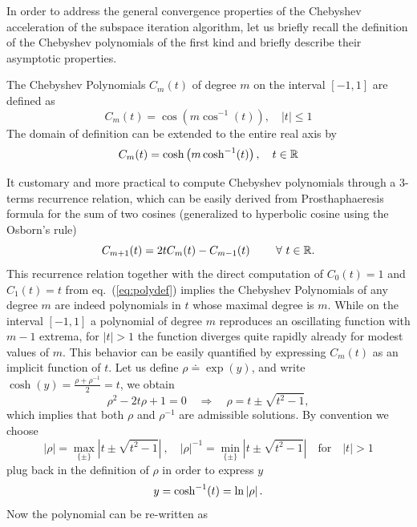 In order to address the general convergence properties of the
Chebyshev acceleration of the subspace iteration algorithm, let us
briefly recall the definition of the Chebyshev polynomials of the
first kind and briefly describe their asymptotic properties.
\begin{definition}
  The Chebyshev Polynomials $C_m(t)$ of degree $m$ on the interval
  $\left[-1,1\right]$ are defined as
	\begin{equation}
	C_m(t)=\cos\left(m\cos^{-1}(t)\right), \quad \left| t\right| \leq 1
	\label{eq:polydef}
	\end{equation} 
The domain of definition can be extended to the entire real axis by
	\begin{equation*}
	C_m(t)=\cosh\left(m\cosh^{-1}(t)\right), \quad t\in\mathbb{R}
	\end{equation*}
\end{definition}
It customary and more practical to compute Chebyshev polynomials
through a 3-terms recurrence relation, which can be easily derived
from Prosthaphaeresis formula for the sum of two cosines (generalized
to hyperbolic cosine using the Osborn's rule)
\begin{equation}
C_{m+1}(t)=2tC_m(t)-C_{m-1}(t)\ \qquad \forall\ t\in \R.
\label{eq:recur}
\end{equation}
This recurrence relation together with the direct computation of
$C_0(t)=1$ and $C_1(t)=t$ from eq.~(\ref{eq:polydef}) implies the
Chebyshev Polynomials of any degree $m$ are indeed polynomials in $t$
whose maximal degree is $m$.  While on the interval $[-1,1]$ a
polynomial of degree $m$ reproduces an oscillating function with $m-1$
extrema, for $|t| > 1$ the function diverges quite rapidly already for
modest values of $m$.  This behavior can be easily quantified by
expressing $C_m(t)$ as an implicit function of $t$.
Let us define $\rho \doteq \exp(y)$, and write $\cosh(y)=\frac{\rho+\rho^{-1}}{2} = t$, 
we obtain
\begin{equation*}
\rho^2-2t\rho+1=0
\quad \Rightarrow \quad \rho=t \pm \sqrt{t^2-1},
\end{equation*}
which implies that both $\rho$ and $\rho^{-1}$ are admissible solutions. By convention we 
choose 
\[
	|\rho| = \max_{\{\pm\}} \left|t \pm \sqrt{t^2-1}\right| \ , 
        \quad |\rho|^{-1} = \min_{\{\pm\}} \left|t \pm \sqrt{t^2-1}\right|
        \quad \textrm{for} \quad |t| >1 
\]
plug back in the definition of $\rho$ in order to express $y$
\[
	y = \textrm{cosh}^{-1}(t)=\ln\left|\rho\right|.
\]
Now the polynomial can be re-written as
